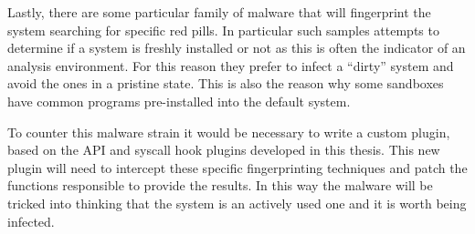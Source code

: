 
Lastly, there are some particular family of malware that will fingerprint the system searching for specific red pills. In particular such samples attempts to determine if a system is freshly installed or not as this is often the indicator of an analysis environment. For this reason they prefer to infect a ``dirty'' system and avoid the ones in a pristine state. This is also the reason why some sandboxes have common programs pre-installed into the default system.

To counter this malware strain it would be necessary to write a custom plugin, based on the API and syscall hook plugins developed in this thesis. This new plugin will need to intercept these specific fingerprinting techniques and patch the functions responsible to provide the results. In this way the malware will be tricked into thinking that the system is an actively used one and it is worth being infected. 